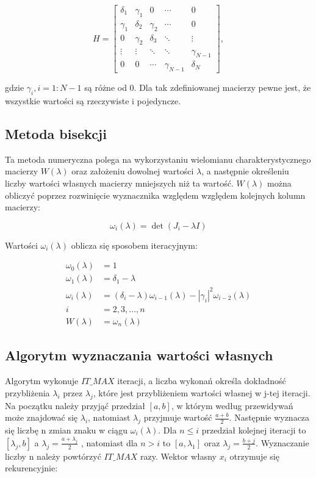 \documentclass{article}
\begin{document}
\begin{equation}
H = \begin{bmatrix}
\delta_1 & \gamma_1 & 0 & \cdots & 0 \\
\gamma_1 & \delta_2 & \gamma_2 & \cdots & 0 \\
0 & \gamma_2 & \delta_3 & \ddots & \vdots \\
\vdots & \vdots & \ddots & \ddots & \gamma_{N-1} \\
0 & 0 & \cdots & \gamma_{N-1} & \delta_N
\end{bmatrix},
\end{equation}

\noindent
gdzie $\gamma_i, i = 1:N-1$ są różne od 0. Dla tak zdefiniowanej macierzy pewne jest, że wszystkie wartości są rzeczywiste i pojedyncze. 

\subsection{Metoda bisekcji}
Ta metoda numeryczna polega na wykorzystaniu wielomianu charakterystycznego macierzy $W(\lambda)$ oraz założeniu dowolnej wartości $\lambda$, a następnie określeniu liczby wartości własnych macierzy mniejszych niż ta wartość. $W(\lambda)$ można obliczyć poprzez rozwinięcie wyznacznika względem względem kolejnych kolumn macierzy:

\begin{equation}
\omega_i(\lambda) = \det(J_i - \lambda I)
\end{equation}

\noindent
Wartości $\omega_i(\lambda)$ oblicza się sposobem iteracyjnym:

\begin{equation}
\begin{aligned}
\omega_0(\lambda) &= 1 \\
\omega_1(\lambda) &= \delta_1 - \lambda \\
\omega_i(\lambda) &= (\delta_i - \lambda)\omega_{i-1}(\lambda) - |\gamma_i|^2\omega_{i-2}(\lambda) \\
i &= 2,3,\ldots,n \\
W(\lambda) &= \omega_n(\lambda)
\end{aligned}
\end{equation}

\subsection{Algorytm wyznaczania wartości własnych}
Algorytm wykonuje $IT\_MAX$ iteracji, a liczba wykonań określa dokładność przybliżenia $\lambda_i$ przez $\lambda_j$, które jest przybliżeniem wartości własnej w j-tej iteracji. Na początku należy przyjąć przedział $[a,b]$, w którym według przewidywań może znajdować się $\lambda_i$, natomiast $\lambda_j$ przyjmuje wartość $\frac{a+b}{2}$. Następnie wyznacza się liczbę n zmian znaku w ciągu $\omega_i(\lambda)$. Dla $n \leq i$ przedział kolejnej iteracji to $[\lambda_j, b]$ a $\lambda_j = \frac{a+\lambda_j}{2}$ , natomiast dla $n > i$ to $[a, \lambda_1]$ oraz $\lambda_j = \frac{b+j}{2}$. Wyznaczanie liczby n należy powtórzyć $IT\_MAX$ razy. Wektor własny $x_i$ otrzymuje się rekurencyjnie:
\end{document}
